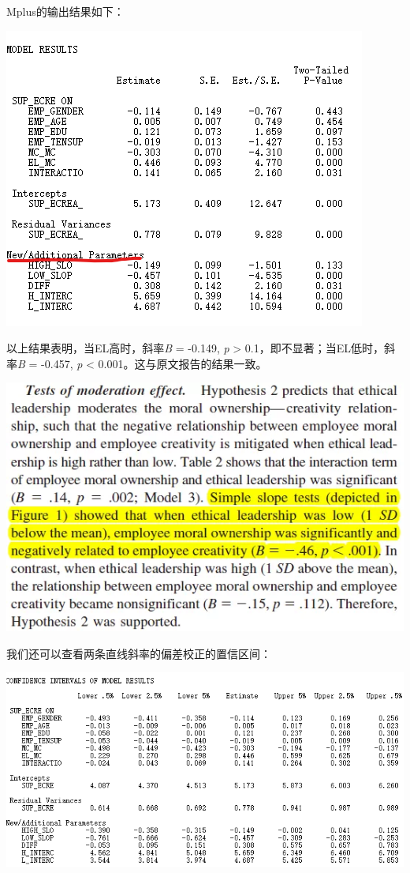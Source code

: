 \documentclass[
]{book}
\begin{document}
Mplus的输出结果如下：

\includegraphics{figs/13111.png}

以上结果表明，当EL高时，斜率\emph{B} = -0.149, \emph{p} \textgreater{} 0.1，即不显著；当EL低时，斜率\emph{B} = -0.457, \emph{p} \textless{} 0.001。这与原文报告的结果一致。

\includegraphics{figs/13112.png}

我们还可以查看两条直线斜率的偏差校正的置信区间：

\includegraphics{figs/13113.png}
\end{document}
